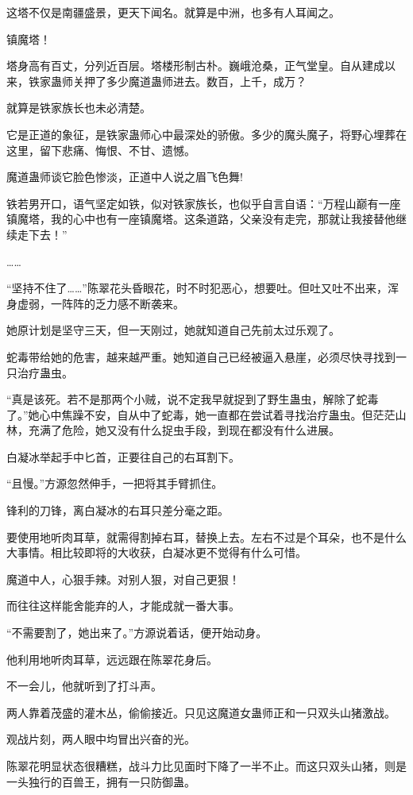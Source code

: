 \begin{this_body}
这塔不仅是南疆盛景，更天下闻名。就算是中洲，也多有人耳闻之。

镇魔塔！

塔身高有百丈，分列近百层。塔楼形制古朴。巍峨沧桑，正气堂皇。自从建成以来，铁家蛊师关押了多少魔道蛊师进去。数百，上千，成万？

就算是铁家族长也未必清楚。

它是正道的象征，是铁家蛊师心中最深处的骄傲。多少的魔头魔子，将野心埋葬在这里，留下悲痛、悔恨、不甘、遗憾。

魔道蛊师谈它脸色惨淡，正道中人说之眉飞色舞!

铁若男开口，语气坚定如铁，似对铁家族长，也似乎自言自语：“万程山巅有一座镇魔塔，我的心中也有一座镇魔塔。这条道路，父亲没有走完，那就让我接替他继续走下去！”

……

“坚持不住了……”陈翠花头昏眼花，时不时犯恶心，想要吐。但吐又吐不出来，浑身虚弱，一阵阵的乏力感不断袭来。

她原计划是坚守三天，但一天刚过，她就知道自己先前太过乐观了。

蛇毒带给她的危害，越来越严重。她知道自己已经被逼入悬崖，必须尽快寻找到一只治疗蛊虫。

“真是该死。若不是那两个小贼，说不定我早就捉到了野生蛊虫，解除了蛇毒了。”她心中焦躁不安，自从中了蛇毒，她一直都在尝试着寻找治疗蛊虫。但茫茫山林，充满了危险，她又没有什么捉虫手段，到现在都没有什么进展。

白凝冰举起手中匕首，正要往自己的右耳割下。

“且慢。”方源忽然伸手，一把将其手臂抓住。

锋利的刀锋，离白凝冰的右耳只差分毫之距。

要使用地听肉耳草，就需得割掉右耳，替换上去。左右不过是个耳朵，也不是什么大事情。相比较即将的大收获，白凝冰更不觉得有什么可惜。

魔道中人，心狠手辣。对别人狠，对自己更狠！

而往往这样能舍能弃的人，才能成就一番大事。

“不需要割了，她出来了。”方源说着话，便开始动身。

他利用地听肉耳草，远远跟在陈翠花身后。

不一会儿，他就听到了打斗声。

两人靠着茂盛的灌木丛，偷偷接近。只见这魔道女蛊师正和一只双头山猪激战。

观战片刻，两人眼中均冒出兴奋的光。

陈翠花明显状态很糟糕，战斗力比见面时下降了一半不止。而这只双头山猪，则是一头独行的百兽王，拥有一只防御蛊。


\end{this_body}
